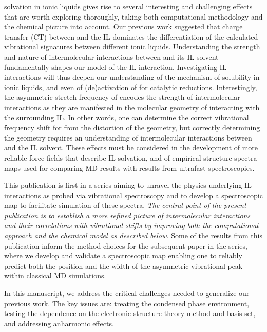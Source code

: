  solvation in ionic liquids gives rise to several interesting and challenging effects that are worth exploring thoroughly, taking both computational methodology and the chemical picture into account. Our previous work suggested that charge transfer (CT) between  and the IL dominates the differentiation of the calculated vibrational signatures between different ionic liquids. Understanding the strength and nature of intermolecular interactions between  and its IL solvent fundamentally shapes our model of the \textendash{}IL interaction. Investigating \textendash{}IL interactions will thus deepen our understanding of the mechanism of  solubility in ionic liquids, and even of (de)activation of  for catalytic reductions. Interestingly, the asymmetric stretch frequency of  encodes the strength of intermolecular interactions as they are manifested in the molecular geometry of  interacting with the surrounding IL. In other words, one can determine the correct vibrational frequency shift for  from the distortion of the  geometry, but correctly determining the  geometry requires an understanding of intermolecular interactions between  and the IL solvent. These effects must be considered in the development of more reliable force fields that describe \textendash{}IL solvation, and of empirical structure-spectra maps used for comparing MD results with results from ultrafast spectroscopies.

This publication is first in a series aiming to unravel the physics underlying \textendash{}IL interactions as probed via vibrational spectroscopy and to develop a spectroscopic map to facilitate simulation of these spectra. \emph{The central point of the present publication is to establish a more refined picture of intermolecular interactions and their correlations with vibrational shifts by improving both the computational approach and the chemical model as described below.} Some of the results from this publication inform the method choices for the subsequent paper in the series, where we develop and validate a spectroscopic map enabling one to reliably predict both the position and the width of the  asymmetric vibrational peak within classical MD simulations.\cite{Daly2016}

In this manuscript, we address the critical challenges needed to generalize our previous work. The key issues are: treating the condensed phase environment, testing the dependence on the electronic structure theory method and basis set, and addressing anharmonic effects.

